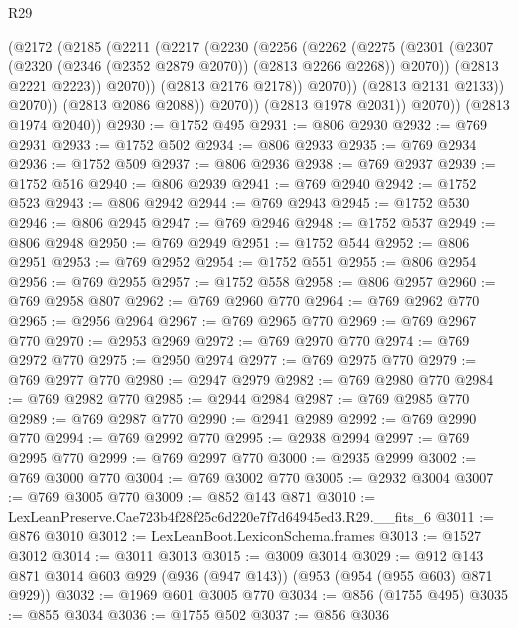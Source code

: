 \begin{lexlean}{R29}
\begin{coremodule}
                    (@2172
                      (@2185
                        (@2211
                          (@2217
                            (@2230
                              (@2256
                                (@2262
                                  (@2275
                                    (@2301
                                      (@2307
                                        (@2320 (@2346 (@2352 @2879 @2070)) (@2813 @2266 @2268))
                                        @2070))
                                    (@2813 @2221 @2223))
                                  @2070))
                              (@2813 @2176 @2178))
                            @2070))
                        (@2813 @2131 @2133))
                      @2070))
                  (@2813 @2086 @2088))
                @2070))
            (@2813 @1978 @2031))
          @2070))
      (@2813 @1974 @2040))
@2930 := @1752 @495
@2931 := @806 @2930
@2932 := @769 @2931
@2933 := @1752 @502
@2934 := @806 @2933
@2935 := @769 @2934
@2936 := @1752 @509
@2937 := @806 @2936
@2938 := @769 @2937
@2939 := @1752 @516
@2940 := @806 @2939
@2941 := @769 @2940
@2942 := @1752 @523
@2943 := @806 @2942
@2944 := @769 @2943
@2945 := @1752 @530
@2946 := @806 @2945
@2947 := @769 @2946
@2948 := @1752 @537
@2949 := @806 @2948
@2950 := @769 @2949
@2951 := @1752 @544
@2952 := @806 @2951
@2953 := @769 @2952
@2954 := @1752 @551
@2955 := @806 @2954
@2956 := @769 @2955
@2957 := @1752 @558
@2958 := @806 @2957
@2960 := @769 @2958 @807
@2962 := @769 @2960 @770
@2964 := @769 @2962 @770
@2965 := @2956 @2964
@2967 := @769 @2965 @770
@2969 := @769 @2967 @770
@2970 := @2953 @2969
@2972 := @769 @2970 @770
@2974 := @769 @2972 @770
@2975 := @2950 @2974
@2977 := @769 @2975 @770
@2979 := @769 @2977 @770
@2980 := @2947 @2979
@2982 := @769 @2980 @770
@2984 := @769 @2982 @770
@2985 := @2944 @2984
@2987 := @769 @2985 @770
@2989 := @769 @2987 @770
@2990 := @2941 @2989
@2992 := @769 @2990 @770
@2994 := @769 @2992 @770
@2995 := @2938 @2994
@2997 := @769 @2995 @770
@2999 := @769 @2997 @770
@3000 := @2935 @2999
@3002 := @769 @3000 @770
@3004 := @769 @3002 @770
@3005 := @2932 @3004
@3007 := @769 @3005 @770
@3009 := @852 @143 @871
@3010 := LexLeanPreserve.Cae723b4f28f25c6d220e7f7d64945ed3.R29.__fits_6
@3011 := @876 @3010
@3012 := LexLeanBoot.LexiconSchema.frames
@3013 := @1527 @3012
@3014 := @3011 @3013
@3015 := @3009 @3014
@3029 := @912 @143 @871 @3014 @603 @929 (@936 (@947 @143)) (@953 (@954 (@955 @603) @871 @929))
@3032 := @1969 @601 @3005 @770
@3034 := @856 (@1755 @495)
@3035 := @855 @3034
@3036 := @1755 @502
@3037 := @856 @3036

\end{coremodule}
\end{lexlean}
